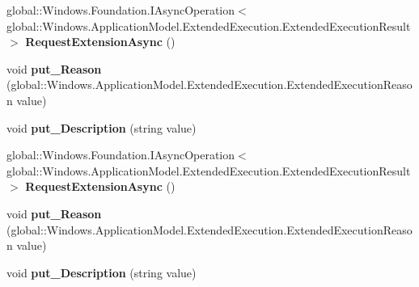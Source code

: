 \begin{DoxyCompactItemize}
global\+::\+Windows.\+Foundation.\+I\+Async\+Operation$<$ global\+::\+Windows.\+Application\+Model.\+Extended\+Execution.\+Extended\+Execution\+Result $>$ {\bfseries Request\+Extension\+Async} ()
\item 
\mbox{\label{interface_windows_1_1_application_model_1_1_extended_execution_1_1_i_extended_execution_session_a5ecf7f48efd35ce9815d586c085ee774}} 
void {\bfseries put\+\_\+\+Reason} (global\+::\+Windows.\+Application\+Model.\+Extended\+Execution.\+Extended\+Execution\+Reason value)
\item 
\mbox{\label{interface_windows_1_1_application_model_1_1_extended_execution_1_1_i_extended_execution_session_a5d1ffef5b854e7f9019b7b153c61fe91}} 
void {\bfseries put\+\_\+\+Description} (string value)
\item 
\mbox{\label{interface_windows_1_1_application_model_1_1_extended_execution_1_1_i_extended_execution_session_a3ae62e16eee49132e7dd5dd891a9c320}} 
global\+::\+Windows.\+Foundation.\+I\+Async\+Operation$<$ global\+::\+Windows.\+Application\+Model.\+Extended\+Execution.\+Extended\+Execution\+Result $>$ {\bfseries Request\+Extension\+Async} ()
\item 
\mbox{\label{interface_windows_1_1_application_model_1_1_extended_execution_1_1_i_extended_execution_session_a5ecf7f48efd35ce9815d586c085ee774}} 
void {\bfseries put\+\_\+\+Reason} (global\+::\+Windows.\+Application\+Model.\+Extended\+Execution.\+Extended\+Execution\+Reason value)
\item 
\mbox{\label{interface_windows_1_1_application_model_1_1_extended_execution_1_1_i_extended_execution_session_a5d1ffef5b854e7f9019b7b153c61fe91}} 
void {\bfseries put\+\_\+\+Description} (string value)
\item 
\mbox{\label{interface_windows_1_1_application_model_1_1_extended_execution_1_1_i_extended_execution_session_a3ae62e16eee49132e7dd5dd891a9c320}} 

\end{DoxyCompactItemize}
